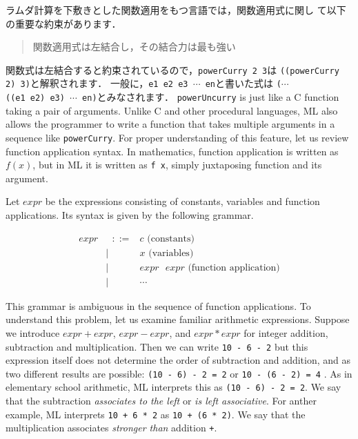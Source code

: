 \documentclass{jbook}
\newcommand{\myem}{\ \ \ \ \  }
\begin{document}
	ラムダ計算を下敷きとした関数適用をもつ言語では，関数適用式に関し
て以下の重要な約束があります．
\begin{quote}
関数適用式は左結合し，その結合力は最も強い
\end{quote}
	関数式は左結合すると約束されているので，{\tt powerCurry 2 3}は
{\tt ((powerCurry 2) 3)}と解釈されます．
	一般に，{\tt e1\ e2\ e3\ $\cdots$\ en}と書いた式は
{\tt ($\cdots$ ((e1\ e2)\ e3)\ $\cdots$\ en)}とみなされます．
\else%
	{\tt powerUncurry} is just like a C function taking a pair of
arguments.
	Unlike C and other procedural languages, ML also allows the
programmer to write a function that takes multiple arguments in a
sequence like {\tt powerCurry}.
	For proper understanding of this feature, let us review function
application syntax.
	In mathematics, function application is written as $f(x)$,
but in ML it is written as {\tt f x}, simply juxtaposing function and its
argument. 

	Let $expr$ be the expressions consisting of constants, variables
and function applications.
	Its syntax is given by the following grammar.
\begin{tt}
\begin{eqnarray*}
expr &\mbox{\ \ }::=& c                  \mbox{\myem\myem (constants)} \\
     &|& x                    \mbox{\myem\myem (variables)} \\
     &|& expr\mbox{\ } expr   \mbox{\ (function application)} \\
     &|& \cdots
\end{eqnarray*}
\end{tt}

	This grammar is ambiguous in the sequence of function
applications.
	To understand this problem, let us examine familiar arithmetic
expressions.
	Suppose we introduce 
$expr + expr$,
$expr - expr$, and
$expr * expr$
for integer addition, subtraction and multiplication.
	Then we can write {\tt 10 - 6 - 2} but this expression
itself does not determine the order of subtraction and addition, and as
two different results are possible: {\tt (10 - 6) - 2 = 2} 
or
{\tt 10 - (6 - 2) = 4} .
	As in elementary school arithmetic, ML interprets this 
as {\tt (10 - 6) - 2 = 2}.
	We say that the subtraction {\em associates to the left} or
{\em is left associative}.
	For anther example, ML interprets {\tt 10 + 6 * 2} as {\tt 10
+ (6 * 2)}.
	We say that the multiplication {\tt *} associates {\em stronger
than} addition {\tt +}.
	
\end{document}
